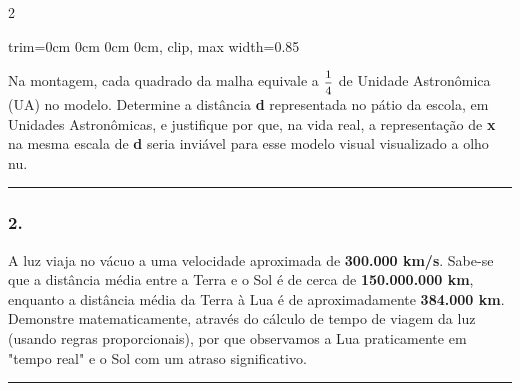 \documentclass[twoside, 10pt, a4paper]{article}
\newlength{\espacoPreQuestao}\setlength{\espacoPreQuestao}{0.1cm}
\newlength{\espacoQuestao}\setlength{\espacoQuestao}{0.2cm}
\newcommand{\larguraTikz}{0.85\linewidth}
\begin{document}
\begin{multicols*}{2}
\begin{center}
\begin{adjustbox}{trim=0cm 0cm 0cm 0cm, clip, max width=\larguraTikz}
\end{adjustbox}
\end{center}

Na montagem, cada quadrado da malha equivale a $ \mfrac{1}{4} $ de Unidade Astronômica (UA) no modelo. Determine a distância \textbf{d} representada no pátio da escola, em Unidades Astronômicas, e justifique por que, na vida real, a representação de \textbf{x} na mesma escala de \textbf{d} seria inviável para esse modelo visual visualizado a olho nu.
\par\vspace{\espacoQuestao}

\noindent\textcolor{CorLinha}{\rule{\linewidth}{0.5pt}} 
\par\vspace{\espacoPreQuestao}
\subsubsection*{2.} A luz viaja no vácuo a uma velocidade aproximada de \textbf{300.000 km/s}. Sabe-se que a distância média entre a Terra e o Sol é de cerca de \textbf{150.000.000 km}, enquanto a distância média da Terra à Lua é de aproximadamente \textbf{384.000 km}. Demonstre matematicamente, através do cálculo de tempo de viagem da luz (usando regras proporcionais), por que observamos a Lua praticamente em "tempo real" e o Sol com um atraso significativo.
\par\vspace{\espacoQuestao}

\noindent\textcolor{CorLinha}{\rule{\linewidth}{0.5pt}} 
\par\vspace{\espacoPreQuestao}

\end{multicols*}
\end{document}
